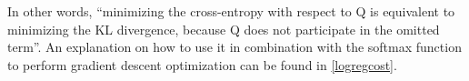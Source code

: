 In other words, ``minimizing the cross-entropy with respect to Q is equivalent to minimizing the KL divergence, because Q does not participate in the omitted term''\cite[p.75]{goodfellow}. An explanation on how to use it in combination with the softmax function to perform gradient descent optimization can be found in \ref{logregcost}.






